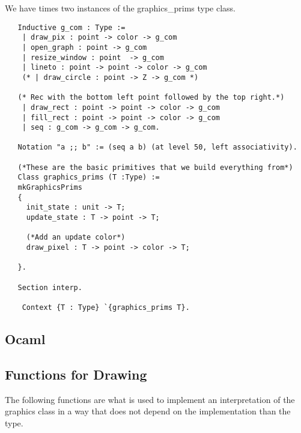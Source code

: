 \documentclass{llncs}
\begin{document}
We have times two instances of the graphics\_prims type class.

\begin{lstlisting}
   Inductive g_com : Type :=
    | draw_pix : point -> color -> g_com
    | open_graph : point -> g_com
    | resize_window : point  -> g_com
    | lineto : point -> point -> color -> g_com
    (* | draw_circle : point -> Z -> g_com *)

   (* Rec with the bottom left point followed by the top right.*)          
    | draw_rect : point -> point -> color -> g_com
    | fill_rect : point -> point -> color -> g_com
    | seq : g_com -> g_com -> g_com.

   Notation "a ;; b" := (seq a b) (at level 50, left associativity).

   (*These are the basic primitives that we build everything from*)
   Class graphics_prims (T :Type) :=
   mkGraphicsPrims
   {
     init_state : unit -> T;
     update_state : T -> point -> T;

     (*Add an update color*)
     draw_pixel : T -> point -> color -> T;

   }.

   Section interp.

    Context {T : Type} `{graphics_prims T}.
  \end{lstlisting}






  

\subsection{Ocaml}


\subsection{Functions for Drawing}
The following functions are what is used to implement an interpretation of the graphics class in a way that does not depend on the implementation than the type.
\end{document}
